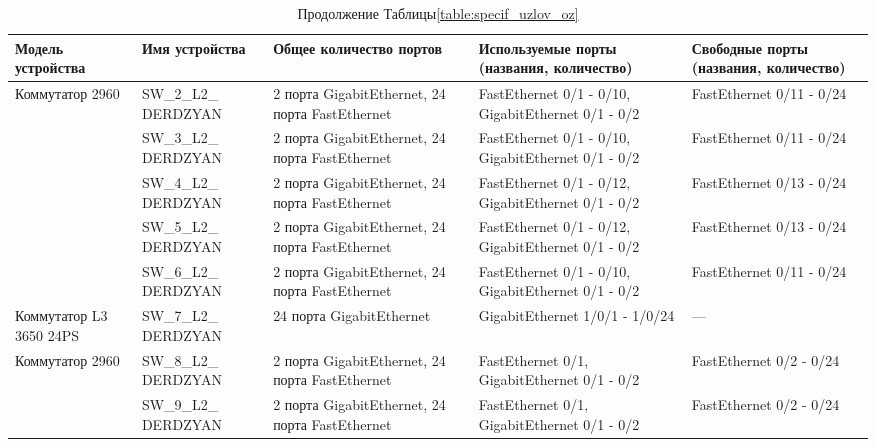 \begin{table}[H]
    \centering
	\caption{Продолжение Таблицы\;\ref{table:specif_uzlov_oz}}
    \small
	\begin{tabularx}{\textwidth}{|X|X|X|X|X|}
        \hline
		Модель устройства&Имя устройства& Общее количество портов&Используемые порты (названия, количество) & Свободные порты (названия, количество) \\
		\hline
		\multirow{5}{*}{Коммутатор 2960}
			&SW\_2\_L2\_ DERDZYAN	& 2 порта GigabitEthernet, 24 порта FastEthernet & FastEthernet 0/1 - 0/10, GigabitEthernet 0/1 - 0/2 & FastEthernet 0/11 - 0/24 \\
		\cline{2-5}
			&SW\_3\_L2\_ DERDZYAN	& 2 порта GigabitEthernet, 24 порта FastEthernet & FastEthernet 0/1 - 0/10, GigabitEthernet 0/1 - 0/2 & FastEthernet 0/11 - 0/24 \\
		\cline{2-5}
			&SW\_4\_L2\_ DERDZYAN	& 2 порта GigabitEthernet, 24 порта FastEthernet & FastEthernet 0/1 - 0/12, GigabitEthernet 0/1 - 0/2 & FastEthernet 0/13 - 0/24  \\
		\cline{2-5}
			&SW\_5\_L2\_ DERDZYAN	& 2 порта GigabitEthernet, 24 порта FastEthernet & FastEthernet 0/1 - 0/12, GigabitEthernet 0/1 - 0/2 & FastEthernet 0/13 - 0/24 \\
		\cline{2-5}
			&SW\_6\_L2\_ DERDZYAN	& 2 порта GigabitEthernet, 24 порта FastEthernet & FastEthernet 0/1 - 0/10, GigabitEthernet 0/1 - 0/2 & FastEthernet 0/11 - 0/24  \\
		\hline
		Коммутатор L3 3650 24PS	&SW\_7\_L2\_ DERDZYAN	& 24 порта GigabitEthernet & GigabitEthernet 1/0/1 - 1/0/24 & --- \\
		\hline
		\multirow{3}{*}{Коммутатор 2960}
			&SW\_8\_L2\_ DERDZYAN	& 2 порта GigabitEthernet, 24 порта FastEthernet & FastEthernet 0/1, GigabitEthernet 0/1 - 0/2 & FastEthernet 0/2 - 0/24 \\
		\cline{2-5}
			&SW\_9\_L2\_ DERDZYAN	& 2 порта GigabitEthernet, 24 порта FastEthernet & FastEthernet 0/1, GigabitEthernet 0/1 - 0/2 & FastEthernet 0/2 - 0/24 \\
			\hline
    \end{tabularx}
\end{table}

